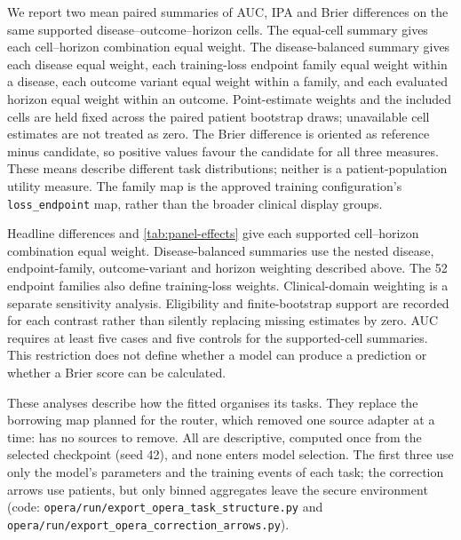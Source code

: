 We report two mean paired summaries of AUC, IPA and Brier differences on the
same supported disease--outcome--horizon cells. The equal-cell summary gives
each cell--horizon combination equal weight. The disease-balanced summary
gives each disease equal weight, each training-loss endpoint family equal
weight within a disease, each outcome variant equal weight within a family,
and each evaluated horizon equal weight within an outcome. Point-estimate
weights and the included cells are held fixed across the paired patient
bootstrap draws; unavailable cell estimates are not treated as zero. The
Brier difference is oriented as reference minus candidate, so positive
values favour the candidate for all three measures. These means describe
different task distributions; neither is a patient-population utility measure.
The family map is the approved training configuration's \texttt{loss\_endpoint}
map, rather than the broader clinical display groups.

Headline differences and \cref{tab:panel-effects} give each supported
cell--horizon combination equal weight. Disease-balanced summaries use the
nested disease, endpoint-family, outcome-variant and horizon weighting described
above. The 52 endpoint families also define training-loss weights. Clinical-domain
weighting is a separate sensitivity analysis. Eligibility and finite-bootstrap
support are recorded for each contrast rather than silently replacing missing
estimates by zero. AUC requires at least five cases and five controls for the
supported-cell summaries. This restriction does not define whether a model
can produce a prediction or whether a Brier score can be calculated.

\label{sec:task-organisation}
These analyses describe how the fitted \opera{} organises its tasks. They
replace the borrowing map planned for the router, which removed one source
adapter at a time: \opera{} has no sources to remove. All are descriptive,
computed once from the selected checkpoint (seed 42), and none enters model
selection. The first three use only the model's parameters and the training
events of each task; the correction arrows use patients, but only binned
aggregates leave the secure environment (code:
\texttt{opera/run/export\_opera\_task\_structure.py} and
\texttt{opera/run/export\_opera\_correction\_arrows.py}).

